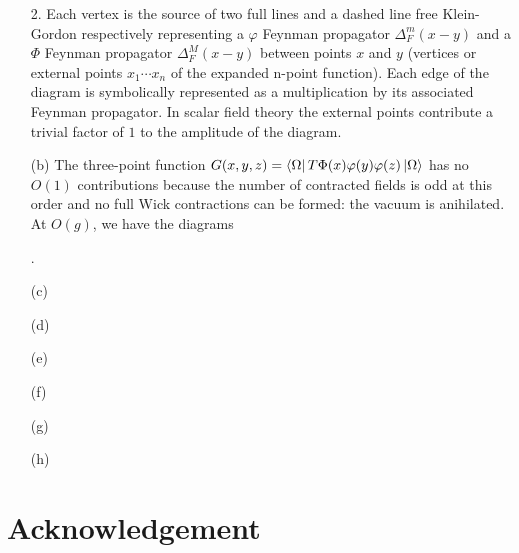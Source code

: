 \documentclass[10pt, a4paper]{article}
\begin{document}
\begin{enumerate}
\begin{minipage}{0.45\textwidth}
\begin{center}
        \end{center}
          2. Each vertex is the source of two full lines and a dashed line free Klein-Gordon respectively representing a $\varphi$ Feynman propagator $\Delta^m_F(x-y)$ and  a $\Phi$ Feynman propagator $\Delta^M_F(x-y)$ between points $x$ and $y$ (vertices or external points $x_1\cdots x_n$ of the expanded n-point function). Each edge of the diagram is symbolically represented as a multiplication by its associated Feynman propagator. In scalar field theory the external points contribute a trivial factor of $1$ to the amplitude of the diagram. 
    \end{minipage}
    
    \item[(b)] The three-point function $G(x, y, z)  = \bra{\Omega}T \Phi(x)\varphi(y)\varphi(z)\ket{\Omega}$ has no $O(1)$ contributions because the number of contracted fields is odd at this order and no full Wick contractions can be formed: the vacuum is anihilated. At $O(g)$, we have the diagrams 
    \begin{center}
        .
    \end{center}
    \item[(c)]
    \item[(d)]
    \item[(e)]
    \item[(f)]
    \item[(g)]
    \item[(h)]  
\end{enumerate}



\section{Acknowledgement}


\makereferences


\end{document}
